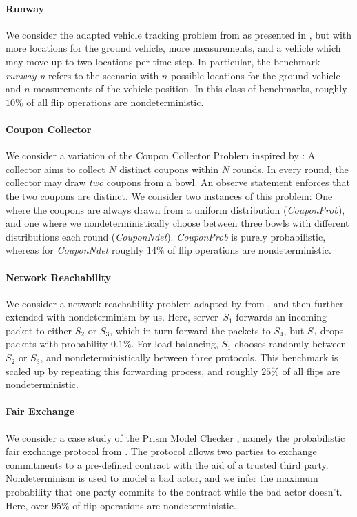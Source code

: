 \paragraph{Runway}
We consider the adapted vehicle tracking problem from \citet{junges2021runtime} as presented in , but with more locations for the ground vehicle, more measurements, and a vehicle which may move up to two locations per time step.
In particular, the benchmark \textit{runway-n} refers to the scenario with $n$ possible locations for the ground vehicle and $n$ measurements of the vehicle position.
In this class of benchmarks, roughly $10\%$ of all flip operations are nondeterministic.

\paragraph{Coupon Collector}
We consider a variation of the Coupon Collector Problem inspired by \citet{jansen2016bounded}:
A collector aims to collect $N$ distinct coupons within $N$ rounds.
In every round, the collector may draw \emph{two} coupons from a bowl.
An observe statement enforces that the two coupons are distinct.
We consider two instances of this problem: One where the coupons are always drawn from a uniform distribution (\textit{CouponProb}), and one where we nondeterministically choose between three bowls with different distributions each round (\textit{CouponNdet}).
\textit{CouponProb} is purely probabilistic, whereas for \textit{CouponNdet} roughly $14\%$ of flip operations are nondeterministic. 

\paragraph{Network Reachability} 
We consider a network reachability problem adapted by \citet{holtzen2020scaling} from \citet{gehr2018bayonet}, and then further extended with nondeterminism by us.
Here, server~$S_1$ forwards an incoming packet to either $S_2$ or $S_3$, which in turn forward the packets to $S_4$, but $S_3$ drops packets with probability $0.1\%$.
For load balancing, $S_1$ chooses randomly between $S_2$ or $S_3$, and nondeterministically between three protocols.
This benchmark is scaled up by repeating this forwarding process, and roughly $25\%$ of all flips are nondeterministic.

\paragraph{Fair Exchange}
We consider a case study of the Prism Model Checker \cite{KNP11}, namely the probabilistic fair exchange protocol from \citet{rabin1983transaction}.
The protocol allows two parties to exchange commitments to a pre-defined contract with the aid of a trusted third party.
Nondeterminism is used to model a bad actor, and we infer the maximum probability that one party commits to the contract while the bad actor doesn't.
Here, over $95\%$ of flip operations are nondeterministic.

